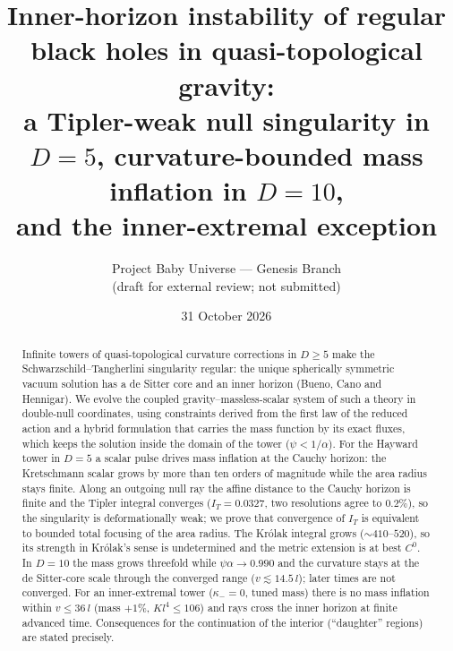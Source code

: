 \documentclass[11pt,a4paper]{article}
\title{Inner-horizon instability of regular black holes in quasi-topological gravity:\\
a Tipler-weak null singularity in $D=5$, curvature-bounded mass inflation in $D=10$,\\ and the inner-extremal exception}
\author{Project Baby Universe --- Genesis Branch\\ \small(draft for external review; not submitted)}
\date{31 October 2026}
\theoremstyle{remark}\newtheorem{remark}[theorem]{Remark}
\begin{document}
\maketitle

\begin{abstract}
Infinite towers of quasi-topological curvature corrections in $D\geq5$ make the Schwarzschild--Tangherlini singularity regular: the unique
spherically symmetric vacuum solution has a de Sitter core and an inner horizon (Bueno, Cano and Hennigar). We evolve the coupled
gravity--massless-scalar system of such a theory in double-null coordinates, using constraints derived from the first law of the reduced
action and a hybrid formulation that carries the mass function by its exact fluxes, which keeps the solution inside the domain of the
tower ($\psi<1/\alpha$). For the Hayward tower in $D=5$ a scalar pulse drives mass inflation at the Cauchy horizon: the Kretschmann
scalar grows by more than ten orders of magnitude while the area radius stays finite. Along an outgoing null ray the affine distance to
the Cauchy horizon is finite and the Tipler integral converges ($I_T=0.0327$, two resolutions agree to $0.2\%$), so the singularity is
deformationally weak; we prove that convergence of $I_T$ is equivalent to bounded total focusing of the area radius. The Kr\'olak
integral grows ($\sim410$--$520$), so its strength in Kr\'olak's sense is undetermined and the metric extension is at best $C^0$.
In $D=10$ the mass grows threefold while $\psi\alpha\to0.990$ and the curvature stays at the de Sitter-core scale through the converged
range ($v\lesssim14.5\,l$); later times are not converged. For an inner-extremal tower ($\kappa_-=0$, tuned mass) there is no mass
inflation within $v\le36\,l$ (mass $+1\%$, $Kl^4\le106$) and rays cross the inner horizon at finite advanced time. Consequences for the
continuation of the interior (``daughter'' regions) are stated precisely.
\end{abstract}
\end{document}
